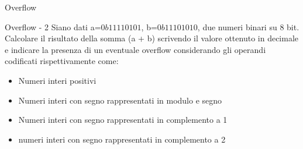 \documentclass[11pt]{article}
\begin{document}
\begin{quiz}{Overflow}
\begin{cloze}[points=1,shuffle=false]{Overflow - 2}
Siano dati a=$0b11110101$, b=$0b11101010$, due numeri binari su 8 bit.
Calcolare il risultato della somma (a + b) scrivendo il valore ottenuto in decimale e indicare la presenza di un eventuale overflow considerando gli operandi codificati rispettivamente come:
\begin{itemize}
    \item Numeri interi positivi
    \item Numeri interi con segno rappresentati in modulo e segno
    \item Numeri interi con segno rappresentati in complemento a 1
    \item numeri interi con segno rappresentati in complemento a 2
\end{itemize}
\end{cloze}


\end{quiz}
\end{document}
